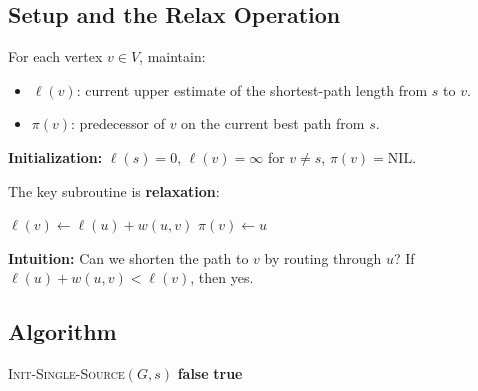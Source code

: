 \subsection{Setup and the Relax Operation}

For each vertex $v \in V$, maintain:
\begin{itemize}[noitemsep]
  \item $\ell(v)$: current upper estimate of the shortest-path length from $s$ to $v$.
  \item $\pi(v)$: predecessor of $v$ on the current best path from $s$.
\end{itemize}

\textbf{Initialization:} $\ell(s) = 0$, $\ell(v) = \infty$ for $v \neq s$, $\pi(v) = \text{NIL}$.

The key subroutine is \textbf{relaxation}:

\begin{algorithm}[H]
\caption{Relax Operation}
\begin{algorithmic}[1]
    \State $\ell(v) \gets \ell(u) + w(u,v)$ 
    \State $\pi(v) \gets u$                  
  \EndIf
\EndProcedure
\end{algorithmic}
\end{algorithm}

\textbf{Intuition:} Can we shorten the path to $v$ by routing through $u$?
If $\ell(u) + w(u,v) < \ell(v)$, then yes.

\subsection{Algorithm}

\begin{algorithm}[H]
\caption{Bellman-Ford Algorithm}
\begin{algorithmic}[1]
  \State \textsc{Init-Single-Source}$(G, s)$ 
      \State {}
    \EndFor
  \EndFor
   
      \State \Return \textbf{false} 
    \EndIf
  \EndFor
  \State \Return \textbf{true}
\EndProcedure
\end{algorithmic}
\end{algorithm}

